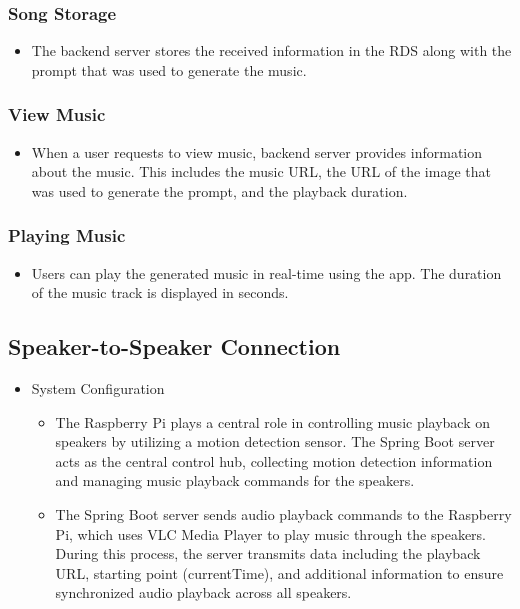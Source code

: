 \documentclass[conference]{IEEEtran}
\begin{document}
\subsubsection{Song Storage}
\begin{itemize}
    \item The backend server stores the received information in the RDS along with the prompt that was used to generate the music.\\
\end{itemize}

\subsubsection{View Music}
\begin{itemize}
    \item When a user requests to view music, backend server provides information about the music. This includes the music URL, the URL of the image that was used to generate the prompt, and the playback duration.\\
\end{itemize}

\subsubsection{Playing Music}
\begin{itemize}
    \item Users can play the generated music in real-time using the app. The duration of the music track is displayed in seconds.\\
\end{itemize}


\subsection{Speaker-to-Speaker Connection}
\begin{itemize}
    \item  System Configuration
\begin{itemize}
    \item The Raspberry Pi plays a central role in controlling music playback on speakers by utilizing a motion detection sensor. The Spring Boot server acts as the central control hub, collecting motion detection information and managing music playback commands for the speakers.\\
    \item The Spring Boot server sends audio playback commands to the Raspberry Pi, which uses VLC Media Player to play music through the speakers. During this process, the server transmits data including the playback URL, starting point (currentTime), and additional information to ensure synchronized audio playback across all speakers.\\
\end{itemize}
\end{itemize}
\end{document}
